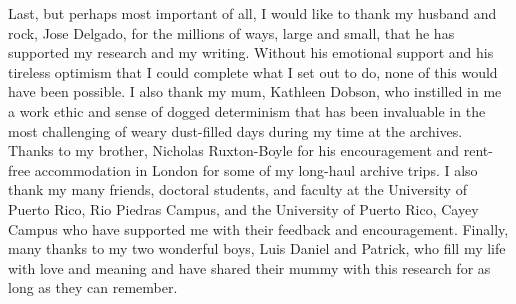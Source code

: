 Last, but perhaps most important of all, I would like to thank my husband and rock, Jose Delgado, for the millions of ways, large and small, that he has supported my research and my writing.  Without his emotional support and his tireless optimism that I could complete what I set out to do, none of this would have been possible. I also thank my mum, Kathleen Dobson, who instilled in me a work ethic and sense of dogged determinism that has been invaluable in the most challenging of weary dust-filled days during my time at the archives. Thanks to my brother, Nicholas Ruxton-Boyle for his encouragement and rent-free accommodation in London for some of my long-haul archive trips. I also thank my many friends, doctoral students, and faculty at the University of Puerto Rico, Rio Piedras Campus, and the University of Puerto Rico, Cayey Campus who have supported me with their feedback and encouragement. Finally, many thanks to my two wonderful boys, Luis Daniel and Patrick, who fill my life with love and meaning and have shared their mummy with this research for as long as they can remember. 
